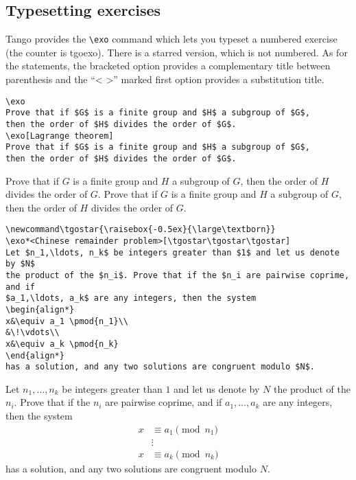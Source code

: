 \documentclass[english,ColorTheme=Red,FontSize=10pt]{tango}
\newcommand\TO[1]{\textsf{#1}}
\begin{document}
\subsection{Typesetting exercises}
Tango provides the \verb+\exo+ command which lets you typeset a numbered exercise (the counter is \TO{tgoexo}). There is a starred version, which is not numbered. As for the statements, the bracketed option provides a complementary title between parenthesis and the \enquote{\TO{< >}} marked first option provides a substitution title.
\begin{tcolorbox}
\begin{verbatim}
\exo 
Prove that if $G$ is a finite group and $H$ a subgroup of $G$,
then the order of $H$ divides the order of $G$.
\exo[Lagrange theorem]
Prove that if $G$ is a finite group and $H$ a subgroup of $G$,
then the order of $H$ divides the order of $G$.
\end{verbatim}
\end{tcolorbox}
\exo 
Prove that if $G$ is a finite group and $H$ a subgroup of $G$, then the order of $H$ divides the order of $G$.
Prove that if $G$ is a finite group and $H$ a subgroup of $G$,
then the order of $H$ divides the order of $G$.
\begin{tcolorbox}
\begin{verbatim}
\newcommand\tgostar{\raisebox{-0.5ex}{\large\textborn}}
\exo*<Chinese remainder problem>[\tgostar\tgostar\tgostar]
Let $n_1,\ldots, n_k$ be integers greater than $1$ and let us denote by $N$
the product of the $n_i$. Prove that if the $n_i are pairwise coprime, and if
$a_1,\ldots, a_k$ are any integers, then the system
\begin{align*}
x&\equiv a_1 \pmod{n_1}\\
&\!\vdots\\
x&\equiv a_k \pmod{n_k}
\end{align*}
has a solution, and any two solutions are congruent modulo $N$.
\end{verbatim}
\end{tcolorbox}
\newcommand\tgostar{\raisebox{-0.5ex}{\large\textborn}}
\exo*<Chinese remainder problem>[\tgostar\tgostar\tgostar]
Let $n_1,\ldots, n_k$ be integers greater than $1$ and let us denote by $N$ the product of the $n_i$.
Prove that if the $n_i$ are pairwise coprime, and if $a_1,\ldots, a_k$ are any integers, then the system
\begin{align*}
x&\equiv a_1 \pmod{n_1}\\
&\!\vdots\\
x&\equiv a_k \pmod{n_k}
\end{align*}
has a solution, and any two solutions are congruent modulo $N$.
\end{document}
